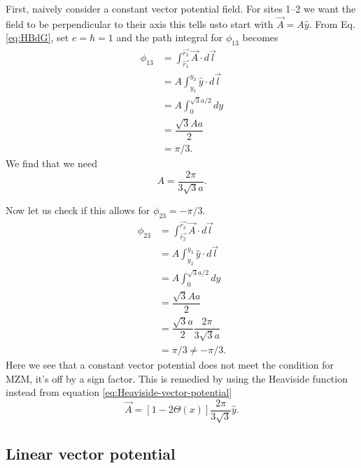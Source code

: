 First, naively consider a constant vector potential field.
For sites 1--2 we want the field to be perpendicular to their axis this tells usto start with $\vec{A} = A\hat{y}$.
From Eq. \ref{eq:HBdG}, set $e=\hbar=1$ and the path integral for $\phi_{13}$ becomes
\begin{align}
  \phi_{13} &= \int_{\vec{r_1}}^{\vec{r_3}} \vec{A} \cdot d\vec{l} \nonumber \\
  &= A \int_{y_1}^{y_3} \hat{y} \cdot d\vec{l} \nonumber \\
  &= A \int_0^{\sqrt{3}a/2} dy \nonumber \\
  &= \dfrac{\sqrt{3} A a}{2} \nonumber \\
  &= \pi/3. \nonumber
\end{align}
We find that we need
\begin{equation} \label{constant vector potential magnitude}
  A = \dfrac{2 \pi}{3 \sqrt{3} a}.
\end{equation}

Now let us check if this allows for $\phi_{23} = -\pi/3$.
\begin{align}
  \phi_{23} &= \int_{\vec{r_2}}^{\vec{r_3}} \vec{A} \cdot d\vec{l} \nonumber \\
  &= A \int_{y_2}^{y_3} \hat{y} \cdot d\vec{l} \nonumber \\
  &= A \int^{\sqrt{3}a/2}_0 dy \nonumber \\
  &= \dfrac{\sqrt{3} A a}{2} \nonumber \\
  &= \dfrac{\sqrt{3} a}{2} \dfrac{2 \pi}{3 \sqrt{3} a} \nonumber \\
  &= \pi/3 \neq -\pi/3. \nonumber
\end{align}
Here we see that a constant vector potential does not meet the condition for MZM, it's off by a sign factor.
This is remedied by using the Heaviside function instead from equation \ref{eq:Heaviside-vector-potential}
\begin{equation}
  \vec{A} = [1-2\Theta(x)] \dfrac{2\pi}{3\sqrt{3}}\hat{y}. \nonumber
\end{equation}

\subsection{Linear vector potential}

